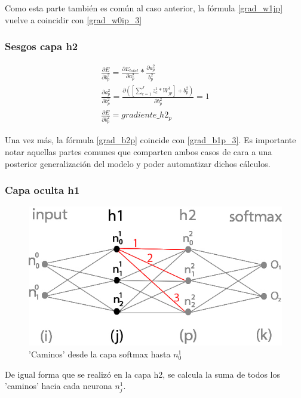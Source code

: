 Como esta parte también es común al caso anterior, la fórmula \ref{grad_w1jp} vuelve a coincidir con \ref{grad_w0ip_3}


\subsubsection{Sesgos capa h2}

\begin{gather}
	\frac{\partial E}{\partial b^2_p} = \frac{\partial E_{total} }{\partial a^2_p } * \frac{\partial a^2_p}{b^2_p} \\
	\frac{\partial a^2_p }{\partial b^2_p } = \frac{\partial ([\sum_{c=1}^{J} z^1_c * W^1_{jp}] + b^2_p) }{\partial b^2_p } = 1 \\
	\frac{\partial E}{\partial b^2_p} = gradiente\_h2_p
	\label{grad_b2p}
\end{gather}

Una vez más, la fórmula \ref{grad_b2p} coincide con \ref{grad_b1p_3}. Es importante notar aquellas partes comunes que comparten ambos casos de cara a una posterior generalización del modelo y poder automatizar dichos cálculos.

\subsubsection{Capa oculta h1}

\begin{figure}[H]
	\centering
	\includegraphics[scale=0.35]{imagenes/nn_h1_caminos_posibles.jpg}  
	\caption{'Caminos' desde la capa softmax hasta $n^1_0$}
	\label{nn_h1_caminos_posibles}
\end{figure}

De igual forma que se realizó en la capa h2, se calcula la suma de todos los 'caminos' hacia cada neurona $n^1_j$. \\

